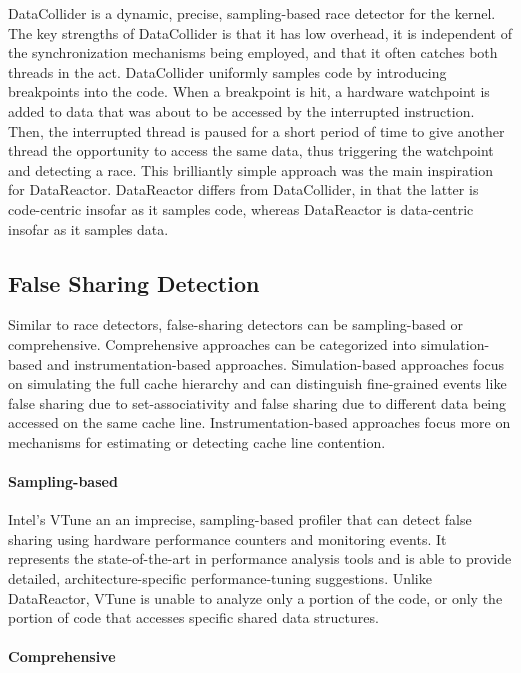 \documentclass{sig-alternate}
\newcommand{\Toolname}{DataReactor}
\begin{document}
DataCollider \cite{DataCollider} is a dynamic, precise, sampling-based race detector for the kernel. The key strengths of
DataCollider is that it has low overhead, it is independent of the synchronization mechanisms being employed, and that
it often catches both threads in the act. DataCollider uniformly samples code by introducing breakpoints into the code.
When a breakpoint is hit, a hardware watchpoint is added to data that was about to be accessed by the interrupted instruction.
Then, the interrupted thread is paused for a short period of time to give another thread the opportunity to access the
same data, thus triggering the watchpoint and detecting a race. This brilliantly simple approach was the main inspiration
for \Toolname{}. \Toolname{} differs from DataCollider, in that the latter is code-centric insofar as it samples code, whereas
\Toolname{} is data-centric insofar as it samples data.

\subsection{False Sharing Detection}

Similar to race detectors, false-sharing detectors can be sampling-based or comprehensive. Comprehensive approaches
can be categorized  into simulation-based and instrumentation-based approaches. Simulation-based approaches focus on
simulating the full cache hierarchy and can distinguish fine-grained events like false sharing due to set-associativity and
false sharing due to different data being accessed on the same cache line. Instrumentation-based approaches focus more
on mechanisms for estimating or detecting cache line contention.

\paragraph{Sampling-based}
Intel's VTune \cite{IntelVTune} an an imprecise, sampling-based profiler that can detect false sharing using hardware performance
counters and monitoring events. It represents the state-of-the-art in performance analysis tools and is able to provide detailed,
architecture-specific performance-tuning suggestions. Unlike \Toolname{}, VTune is unable to analyze only a portion of the code,
or only the portion of code that accesses specific shared data structures.

\paragraph{Comprehensive}
\end{document}
